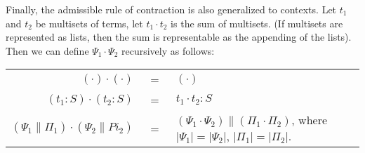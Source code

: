 \vspace{1ex}

\noindent
Finally, the admissible rule of contraction is also generalized to contexts. Let $t_1$ and $t_2$ be multisets of terms, 
let $t_1 \cdot t_2$ is the sum of multisets. (If multisets are represented as lists, then the sum is representable as the
appending of the lists). Then we can define $\Psi_1 \cdot \Psi_2$ recursively as follows:
\begin{center}
\begin{tabular}{rcl}
$(\cdot)\cdot(\cdot)$ &\ =\ & $(\cdot)$\\
$(t_1: S)\cdot (t_2:S)$ &\ =\ & $t_1\cdot t_2 : S$\\
$(\Psi_1\|\Pi_1)\cdot(\Psi_2\|Pi_2)$ &\ =\ & $(\Psi_1\cdot\Psi_2)\|(\Pi_1\cdot\Pi_2)$, \qquad where $|\Psi_1|=|\Psi_2|$, 
$|\Pi_1|=|\Pi_2|$.
\end{tabular}
\end{center}
